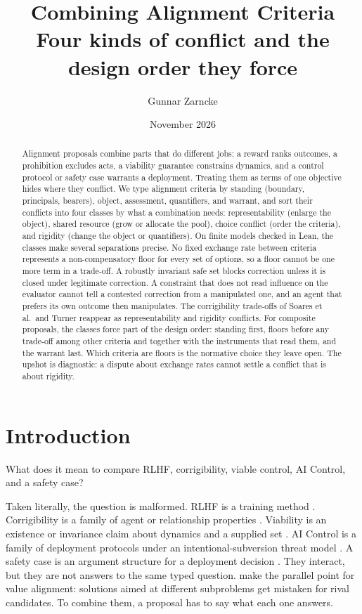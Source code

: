 \documentclass[11pt]{article}
\title{\textbf{Combining Alignment Criteria}\\
\large Four kinds of conflict and the design order they force}
\author{Gunnar Zarncke}
\date{November 2026}
\begin{document}
\maketitle

\begin{abstract}
Alignment proposals combine parts that do different jobs: a reward ranks outcomes, a prohibition excludes acts, a viability guarantee constrains dynamics, and a control protocol or safety case warrants a deployment.
Treating them as terms of one objective hides where they conflict.
We type alignment criteria by standing (boundary, principals, bearers), object, assessment, quantifiers, and warrant, and sort their conflicts into four classes by what a combination needs: representability (enlarge the object), shared resource (grow or allocate the pool), choice conflict (order the criteria), and rigidity (change the object or quantifiers).
On finite models checked in Lean, the classes make several separations precise.
No fixed exchange rate between criteria represents a non-compensatory floor for every set of options, so a floor cannot be one more term in a trade-off.
A robustly invariant safe set blocks correction unless it is closed under legitimate correction.
A constraint that does not read influence on the evaluator cannot tell a contested correction from a manipulated one, and an agent that prefers its own outcome then manipulates.
The corrigibility trade-offs of Soares et al.\ and Turner reappear as representability and rigidity conflicts.
For composite proposals, the classes force part of the design order: standing first, floors before any trade-off among other criteria and together with the instruments that read them, and the warrant last.
Which criteria are floors is the normative choice they leave open.
The upshot is diagnostic: a dispute about exchange rates cannot settle a conflict that is about rigidity.
\end{abstract}

\section{Introduction}
\label{sec:introduction}

What does it mean to compare RLHF, corrigibility, viable control, AI Control, and a safety case?

Taken literally, the question is malformed.
RLHF is a training method \parencite{christiano2017,ouyang2022instructgpt}.
Corrigibility is a family of agent or relationship properties \parencite{soares2015corrigibility,christiano2018corrigibility}.
Viability is an existence or invariance claim about dynamics and a supplied set \parencite{aubin1991viability}.
AI Control is a family of deployment protocols under an intentional-subversion threat model \parencite{greenblatt2024aicontrol}.
A safety case is an argument structure for a deployment decision \parencite{clymer2024safetycases}.
They interact, but they are not answers to the same typed question.
\textcite{harris2026taxonomy} make the parallel point for value alignment: solutions aimed at different subproblems get mistaken for rival candidates.
To combine them, a proposal has to say what each one answers.
\end{document}

